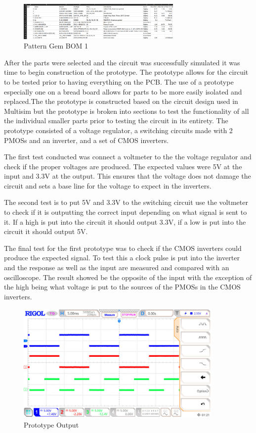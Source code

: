 \documentclass[12pt]{article}
\begin{document}
        \begin{figure}[htp]
            \centering
            \includegraphics[width=8cm]{BOM1.png}
            \caption{Pattern Gem BOM 1}
        \end{figure}

        \newpage

        \par After the parts were selected and the circuit was successfully simulated it was time to begin construction of the prototype. The prototype allows for the circuit to be tested prior to having everything on the PCB. The use of a prototype especially one on a bread board allows for parts to be more easily isolated and replaced.The the prototype is constructed based on the circuit design used in Multisim but the prototype is broken into sections to test the functionality of all the individual smaller parts prior to testing the circuit in its entirety. The prototype consisted of a voltage regulator, a switching circuits made with 2 PMOSs and an inverter, and a set of CMOS inverters.
        \par The first test conducted was connect a voltmeter to the the voltage regulator and check if the proper voltages are produced. The expected values were 5V at the input and 3.3V at the output. This ensures that the voltage does not damage the circuit and sets a base line for the voltage to expect in the inverters. 
        \par The second test is to put 5V and 3.3V to the switching circuit use the voltmeter to check if it is outputting the correct input depending on what signal is sent to it. If a high is put into the circuit it should output 3.3V, if a low is put into the circuit it should output 5V.
        \par The final test for the first prototype was to check if the CMOS inverters could produce the expected signal. To test this a clock pulse is put into the inverter and the response as well as the input are measured and compared with an oscilloscope. The result showed be the opposite of the input with the exception of the high being what voltage is put to the sources of the PMOSs in the CMOS inverters.

        \begin{figure}[htp]
            \centering
            \includegraphics[width=10cm]{ECE-388 sqrwv2.pdf}
            \caption{Prototype Output}
        \end{figure}
\end{document}
